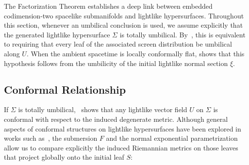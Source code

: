 \documentclass[11pt]{article}
\numberwithin{equation}{section}
\begin{document}
	
	
	The Factorization Theorem establishes a deep link between embedded codimension-two spacelike submanifolds and lightlike hypersurfaces. Throughout this section, whenever an umbilical conclusion is used, we assume explicitly that the generated lightlike hypersurface $\Sigma$ is totally umbilical. By~, this is equivalent to requiring that every leaf of the associated screen distribution be umbilical along $U$. When the ambient spacetime is locally conformally flat,  shows that this hypothesis follows from the umbilicity of the initial lightlike normal section $\xi$.
	
	\subsection{Conformal Relationship}
	
	If $\Sigma$ is totally umbilical,~ shows that any lightlike vector field $U$ on $\Sigma$ is conformal with respect to the induced degenerate metric. Although general aspects of conformal structures on lightlike hypersurfaces have been explored in works such as~\cite{Duggal_Sahin,DuggalSharma}, the submersion $F$ and the normal exponential parametrization allow us to compare explicitly the induced Riemannian metrics on those leaves that project globally onto the initial leaf $S$:
	
\end{document}
